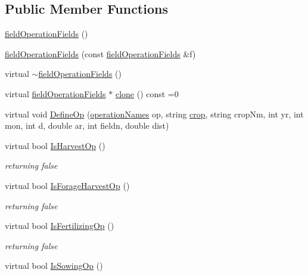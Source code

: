 \subsection*{Public Member Functions}
\begin{DoxyCompactItemize}
\item 
\hyperlink{classfield_operation_fields_aad9cd8f2eed136e9c879015c9448ea7c}{fieldOperationFields} ()
\item 
\hyperlink{classfield_operation_fields_a0d657942c622b9cf5557d65323749d19}{fieldOperationFields} (const \hyperlink{classfield_operation_fields}{fieldOperationFields} \&f)
\item 
virtual \hyperlink{classfield_operation_fields_ad37661d4c850cbebe5361edac85ff361}{$\sim$fieldOperationFields} ()
\item 
virtual \hyperlink{classfield_operation_fields}{fieldOperationFields} $\ast$ \hyperlink{classfield_operation_fields_ae5d8585b7e57196ce3801eed29677b3e}{clone} () const =0
\item 
virtual void \hyperlink{classfield_operation_fields_a5bc5560caa7ecd638172f5a7f74ffe10}{DefineOp} (\hyperlink{operation_names_8h_a77d40de6faa131199a5de6df3d9c7e3d}{operationNames} op, string \hyperlink{classcrop}{crop}, string cropNm, int yr, int mon, int d, double ar, int fieldn, double dist)
\item 
virtual bool \hyperlink{classfield_operation_fields_ad9bda8d7d67001b38bc34e82fa344fca}{IsHarvestOp} ()
\begin{DoxyCompactList}\small\item\em returning false \item\end{DoxyCompactList}\item 
virtual bool \hyperlink{classfield_operation_fields_adc42e16ecf40bc87b2b073e7aa3e42b4}{IsForageHarvestOp} ()
\begin{DoxyCompactList}\small\item\em returning false \item\end{DoxyCompactList}\item 
virtual bool \hyperlink{classfield_operation_fields_ae21a07b4ab147829465e5b79418708f7}{IsFertilizingOp} ()
\begin{DoxyCompactList}\small\item\em returning false \item\end{DoxyCompactList}\item 
virtual bool \hyperlink{classfield_operation_fields_a223d85319e913d2337715db404a47c4f}{IsSowingOp} ()

\end{DoxyCompactItemize}
